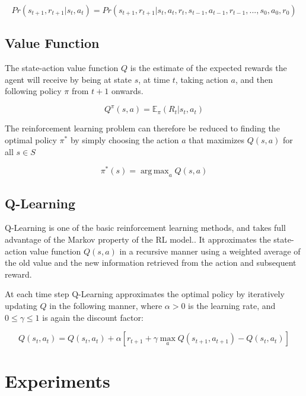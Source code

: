 \documentclass[11pt, oneside]{article}   	%
\DeclareMathOperator*{\argmax}{arg\,max}
\begin{document}
\begin{equation}
Pr(s_{t+1}, r_{t+1} | s_t, a_t) = Pr(s_{t+1}, r_{t+1} | s_t,a_t, r_t, s_{t-1}, a_{t-1}, r_{t-1},...,s_0, a_0, r_0)
\end{equation}

\subsection{Value Function}
The state-action value function $Q$ is the estimate of the expected rewards the agent will receive by being at state $s$, at time $t$, taking action $a$, and then following policy $\pi$ from $t+1$ onwards. 

\begin{equation}
Q^\pi(s,a) = \mathbb{E}_\pi(R_t | s_t, a_t)
\end{equation}

The reinforcement learning problem can therefore be reduced to finding the optimal policy $\pi^*$ by simply choosing the action $a$ that maximizes $Q(s,a)$ for all $s \in S$ 

\begin{equation}
\pi^*(s) = \argmax_a{Q(s,a)}
\end{equation}

\subsection{Q-Learning}

Q-Learning is one of the basic reinforcement learning methods, and takes full advantage of the Markov property of the RL model.. It approximates the state-action value function $Q(s,a)$ in a recursive manner using a weighted average of the old value and the new information retrieved from the action and subsequent reward. 

\hfill

At each time step Q-Learning approximates the optimal policy by iteratively updating $Q$ in the following manner, where $\alpha > 0$ is the learning rate, and $0 \leq \gamma \leq 1$ is again the discount factor:

\begin{equation}
Q(s_t, a_t) = Q(s_t, a_t) + \alpha[r_{t+1} + \gamma \max_aQ(s_{t+1}, a_{t+1}) - Q(s_t, a_t)]
\end{equation}

\section{Experiments}
\end{document}
